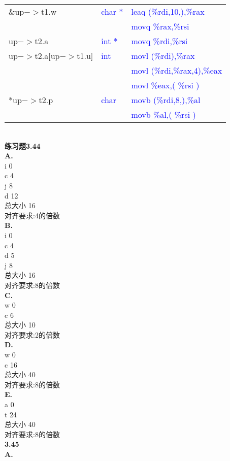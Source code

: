 \documentclass{article}
\newcommand{\blue}[1]{\textcolor{blue}{#1}}
\begin{document}
\begin{CJK}{UTF8}{uyhei}
\begin{table}[htbp]
\begin{tabular}{|m{12em}<{\centering}|m{8em}<{\centering}|m{18em}<{\centering}|}
\hline
\&up$->$t1.w	&	\blue{char *}	&	\blue{leaq (\%rdi,10,),\%rax}	\\
		&			&	\blue{movq \%rax,\%rsi}		\\
\hline
up$->$t2.a	&	\blue{int *}	&	\blue{movq \%rdi,\%rsi}		\\
\hline
up$->$t2.a[up$->$t1.u]	&	\blue{int}	&	\blue{movl (\%rdi),\%rax}	\\
			&			&	\blue{movl (\%rdi,\%rax,4),\%eax}	\\
			&			&	\blue{movl \%eax,( \%rsi )}	\\
\hline
*up$->$t2.p		&	\blue{char}	&	\blue{movb (\%rdi,8,),\%al}	\\
			&			&	\blue{movb \%al,( \%rsi )}			\\
\hline
\end{tabular}
\end{table}	\\[2ex]
\textbf{练习题3.44}	\\[2ex]
\textbf{A.}	\\[1ex]
i	0	\\
c	4	\\
j	8	\\
d	12	\\
总大小	16	\\
对齐要求:4的倍数	\\[1ex]
\textbf{B.}	\\[1ex]
i	0	\\
c	4	\\
d	5	\\
j	8	\\
总大小	16	\\
对齐要求:8的倍数	\\[1ex]
\textbf{C.}	\\[1ex]
w	0	\\
c	6	\\
总大小	10	\\
对齐要求:2的倍数	\\[1ex]
\textbf{D.}	\\[1ex]
w	0	\\
c	16	\\
总大小	40	\\
对齐要求:8的倍数	\\[1ex]
\textbf{E.}	\\[1ex]
a	0	\\
t	24	\\
总大小	40	\\
对齐要求:8的倍数	\\[2ex]
\textbf{3.45}	\\
\textbf{A.}	\\[-3ex]

\end{CJK}
\end{document}
